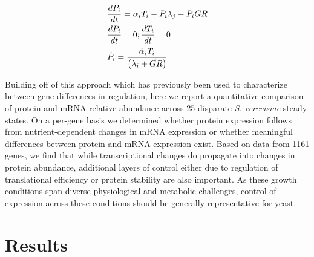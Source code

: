 \begin{align}
&\frac{dP_{i}}{dt} = \alpha_{i}T_{i} - P_{i}\lambda_{j} - P_{i}GR\notag\\
&\frac{dP_{i}}{dt} = 0 ; \frac{dT_{i}}{dt} = 0 \notag\\
&\dot{P}_{i} = \frac{\dot{\alpha}_{i}\dot{T}_{i}}{\left(\dot{\lambda}_{i} + \dot{GR}\right)}\label{steady_expression}
\end{align}




Building off of this approach which has previously been used to characterize between-gene differences in regulation, here we report a quantitative comparison of protein and mRNA relative abundance across 25 disparate \textit{S. cerevisiae} steady-states.  On a per-gene basis we determined whether protein expression follows from nutrient-dependent changes in mRNA expression or whether meaningful differences between protein and mRNA expression exist.  Based on data from 1161 genes, we find that while transcriptional changes do propagate into changes in protein abundance, additional layers of control either due to regulation of translational efficiency or protein stability are also important. As these growth conditions span diverse physiological and metabolic challenges, control of expression across these conditions should be generally representative for yeast.

\section{Results}

